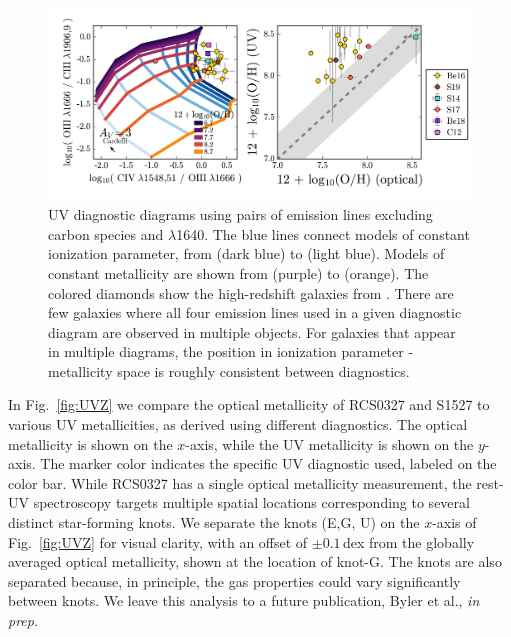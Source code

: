 \begin{figure}
  \begin{center}
    \includegraphics[width=\linewidth]{figs/f5.png}
    \caption{UV diagnostic diagrams using pairs of emission lines excluding carbon species and \heii$\lambda$1640.  The blue lines connect models of constant ionization parameter, from  (dark blue) to  (light blue). Models of constant metallicity are shown from  (purple) to  (orange). The colored diamonds show the high-redshift galaxies from \citet{Rigby+2018b}. There are few galaxies where all four emission lines used in a given diagnostic diagram are observed in multiple objects. For galaxies that appear in multiple diagrams, the position in ionization parameter - metallicity space is roughly consistent between diagnostics.}
    \label{fig:UVSiO}
  \end{center}
\end{figure}

In Fig.~\ref{fig:UVZ} we compare the optical metallicity of RCS0327 and S1527 to various UV metallicities, as derived using different diagnostics. The optical metallicity is shown on the $x$-axis, while the UV metallicity is shown on the $y$-axis. The marker color indicates the specific UV diagnostic used, labeled on the color bar. While RCS0327 has a single optical metallicity measurement, the rest-UV spectroscopy targets multiple spatial locations corresponding to several distinct star-forming knots. We separate the knots (E,G, U) on the $x$-axis of Fig.~\ref{fig:UVZ} for visual clarity, with an offset of $\pm 0.1$\,dex from the globally averaged optical metallicity, shown at the location of knot-G. The knots are also separated because, in principle, the gas properties could vary significantly between knots. We leave this analysis to a future publication, Byler et al., \emph{in prep}.

